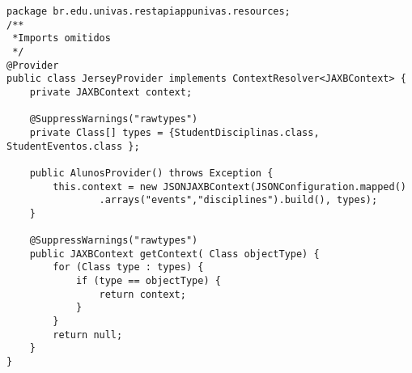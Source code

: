 \begin{lstlisting}[style=custom_JAVA]
package br.edu.univas.restapiappunivas.resources;
/**
 *Imports omitidos
 */
@Provider
public class JerseyProvider implements ContextResolver<JAXBContext> {
	private JAXBContext context;

	@SuppressWarnings("rawtypes")
	private Class[] types = {StudentDisciplinas.class, StudentEventos.class };

	public AlunosProvider() throws Exception {
		this.context = new JSONJAXBContext(JSONConfiguration.mapped()
				.arrays("events","disciplines").build(), types);
	}

	@SuppressWarnings("rawtypes")
	public JAXBContext getContext( Class objectType) {
		for (Class type : types) {
			if (type == objectType) {
				return context;
			}
		}
		return null;
	}
}
\end{lstlisting}